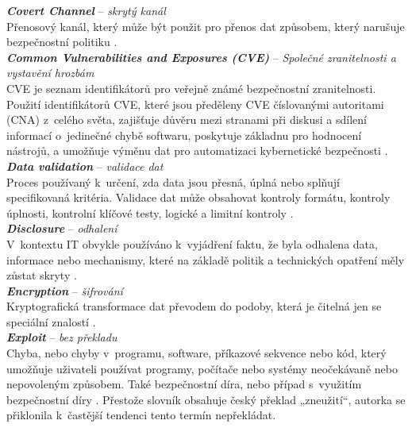 \textit{\textbf{Covert Channel}} -- \textit{skrytý kanál} \label{app:a:covertchannel} \\ %
Přenosový kanál, který může být použit pro přenos dat způsobem, který narušuje bezpečnostní politiku \cite[str. 104]{Slovnik2015}. \\

\textit{\textbf{Common Vulnerabilities and Exposures (CVE)}} -- \textit{Společné zranitelnosti a vystavění hrozbám} \label{app:a:cve} \\ %
CVE je seznam identifikátorů pro veřejně známé bezpečnostní zranitelnosti. Použití identifikátorů CVE, které jsou předěleny CVE číslovanými autoritami (CNA) z~celého světa, zajišťuje důvěru mezi stranami při diskusi a sdílení informací o~jedinečné chybě softwaru, poskytuje základnu pro hodnocení nástrojů, a umožňuje výměnu dat pro automatizaci \mbox{kybernetické} bezpečnosti \cite{CVEWeb}. \\

\textit{\textbf{Data validation}} -- \textit{validace dat} \label{app:a:datavalidation} \\ %
Proces používaný k~určení, zda data jsou přesná, úplná nebo splňují specifikovaná kritéria. Validace dat může obsahovat kontroly formátu, kontroly úplnosti, kontrolní klíčové testy, logické a limitní kontroly \cite[str. 122]{Slovnik2015}. \\

\textit{\textbf{Disclosure}} -- \textit{odhalení} \label{app:a:disclosure} \\ %
V~kontextu IT obvykle používáno k~vyjádření faktu, že byla odhalena data, informace nebo mechanismy, které na základě politik a technických opatření měly zůstat skryty \cite[str. 77]{Slovnik2015}. \\

\textit{\textbf{Encryption}} -- \textit{šifrování} \label{app:a:encryption} \\ %
Kryptografická transformace dat převodem do podoby, která je čitelná jen se speciální \mbox{znalostí} \cite[str. 115]{Slovnik2015}. \\

\textit{\textbf{Exploit}} -- \textit{bez překladu} \label{app:a:exploit} \\
Chyba, nebo chyby v~programu, software, příkazové sekvence nebo kód, který umožňuje uživateli používat programy, počítače nebo systémy neočekávaně nebo nepovoleným způsobem. Také bezpečnostní díra, nebo případ s~využitím bezpečnostní díry \cite[str. 135]{Slovnik2015}.  Přestože slovník obsahuje český překlad „zneužití“, autorka se přiklonila k~častější tendenci tento termín nepřekládat. \\

